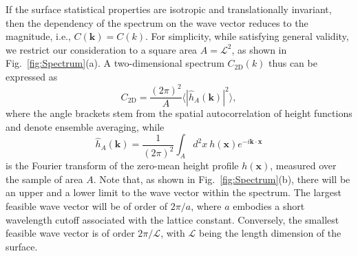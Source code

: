 \documentclass[a4,12pt]{article} %
\begin{document}
If the surface statistical properties are isotropic and translationally invariant, then the dependency of the spectrum on the wave vector reduces to the magnitude, i.e., $C(\boldsymbol{k}) = C(k)$. For simplicity, while satisfying general validity, we restrict our consideration to a square area $A = \mathcal{L}^2$, as shown in Fig.~\ref{fig:Spectrum}(a). A two-dimensional spectrum $C_{\text{2D}}(k)$ thus can be expressed as~\cite{persson2004nature}
\begin{equation}
    C_{\text{2D}} = \frac{(2\pi)^2}{A} \langle \left| \hat{h}_A(\boldsymbol{k}) \right|^2  \rangle,
    \label{eq:Spectrum}
\end{equation}
where the angle brackets stem from the spatial autocorrelation of height functions and denote ensemble averaging, while
\begin{equation}
    \hat{h}_{A}(\boldsymbol{k}) = \frac{1}{(2\pi)^2} \int_{A} d^2 x ~ h(\boldsymbol{x}) e^{- i \boldsymbol{k} \cdot \boldsymbol{x}}
    \label{eq:FourierTransform}
\end{equation}
is the Fourier transform of the zero-mean height profile $h(\boldsymbol{x})$, measured over the sample of area $A$. Note that, as shown in Fig.~\ref{fig:Spectrum}(b), there will be an upper and a lower limit to the wave vector within the spectrum. The largest feasible wave vector will be of order of $2\pi /a$, where $a$ embodies a short wavelength cutoff associated with the lattice constant. Conversely, the smallest feasible wave vector is of order $2\pi / \mathcal{L}$, with $\mathcal{L}$ being the length dimension of the surface.








\end{document}
